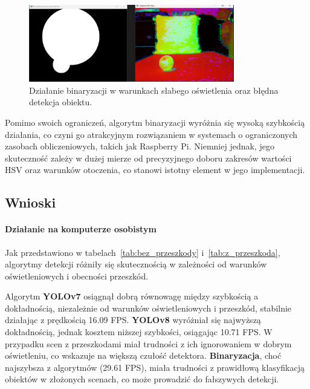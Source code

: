 \documentclass[a4paper,twoside,12pt]{book}
\begin{document}
\begin{figure}[h]
    \centering
    \includegraphics[width=0.8\textwidth]{Images/Porownanie/Binaryzacja/Zrzut ekranu 2025-01-02 193858.png}
    \caption{Działanie binaryzacji w warunkach słabego oświetlenia oraz błędna detekcja obiektu.}
    \label{fig:binary_confusion_goodlight_badobject}
\end{figure}

Pomimo swoich ograniczeń, algorytm binaryzacji wyróżnia się wysoką szybkością działania, co czyni go atrakcyjnym rozwiązaniem w systemach o ograniczonych zasobach obliczeniowych, takich jak Raspberry Pi. Niemniej jednak, jego skuteczność zależy w dużej mierze od precyzyjnego doboru zakresów wartości HSV oraz warunków otoczenia, co stanowi istotny element w jego implementacji.


\newpage
\subsection{Wnioski}

\paragraph{Działanie na komputerze osobistym}
Jak przedstawiono w tabelach~\ref{tab:bez_przeszkody} i~\ref{tab:z_przeszkoda}, algorytmy detekcji różniły się skutecznością w zależności od warunków oświetleniowych i obecności przeszkód. 

Algorytm \textbf{YOLOv7} osiągnął dobrą równowagę między szybkością a dokładnością, niezależnie od warunków oświetleniowych i przeszkód, stabilnie działając z prędkością 16.09 FPS. \textbf{YOLOv8} wyróżniał się najwyższą dokładnością, jednak kosztem niższej szybkości, osiągając 10.71 FPS. W przypadku scen z przeszkodami miał trudności z ich ignorowaniem w dobrym oświetleniu, co wskazuje na większą czułość detektora. \textbf{Binaryzacja}, choć najszybsza z algorytmów (29.61 FPS), miała trudności z prawidłową klasyfikacją obiektów w złożonych scenach, co może prowadzić do fałszywych detekcji.
\end{document}
